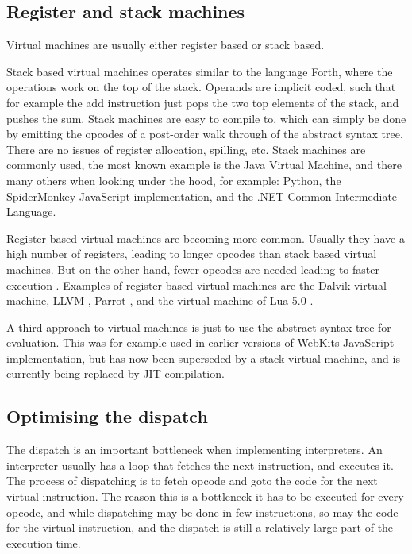 \documentclass[11pt]{report}
\begin{document}
\subsection{Register and stack machines}
Virtual machines are usually either register based or stack based.

Stack based virtual machines operates similar to the language Forth, where the operations work on the top of the stack. 
Operands are implicit coded, such that for example the add instruction just pops the two top elements of the stack, and pushes the sum. 
Stack machines are easy to compile to, 
which can simply be done by emitting the opcodes of a post-order walk through of the abstract syntax tree. 
There are no issues of register allocation, spilling, etc.
Stack machines are commonly used, the most known example is the Java Virtual Machine, and there many others when looking under the hood, for example: Python, the SpiderMonkey JavaScript implementation, and the .NET Common Intermediate Language.

Register based virtual machines are becoming more common. 
Usually they have a high number of registers, leading to longer opcodes than stack based virtual machines. But on the other hand, fewer opcodes are needed leading to faster execution \cite{register-vs-stack1, register-vs-stack2}. 
Examples of register based virtual machines are the Dalvik \cite{dalvik-vm} virtual machine, LLVM \cite{llvm}, Parrot \cite{parrot}, and the virtual machine of Lua 5.0 \cite{luavm}.

A third approach to virtual machines is just to use the abstract syntax tree for evaluation. This was for example used in earlier versions of WebKits JavaScript implementation, but has now been superseded by a stack virtual machine, and is currently being replaced by JIT compilation.

\subsection{Optimising the dispatch}
The dispatch is an important bottleneck when implementing interpreters.
An interpreter usually has a loop that fetches the next instruction, and executes it. The process of dispatching is to fetch opcode and goto the code for the next virtual instruction.
The reason this is a bottleneck it has to be executed for every opcode, and while dispatching may be done in few instructions, so may the code for the virtual instruction, and the dispatch is still a relatively large part of the execution time. 
\end{document}

